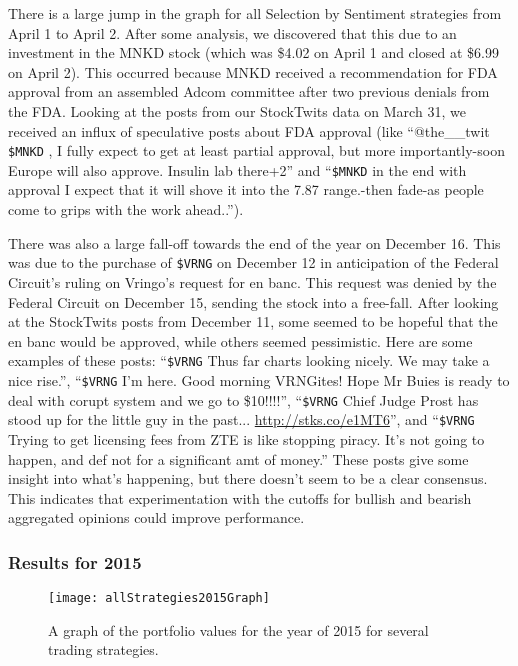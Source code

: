 There is a large jump in the graph for all Selection by Sentiment strategies from April 1 to April 2.
After some analysis, we discovered that this due to an investment in the MNKD stock (which was \$4.02 on April 1 and closed at \$6.99 on April 2).
This occurred because MNKD received a recommendation for FDA approval from an assembled Adcom committee after two previous denials from the FDA.
Looking at the posts from our StockTwits data on March 31, we received an influx of speculative posts about FDA approval (like ``@the\_\_twit \texttt{\$MNKD} , I fully expect to get at least partial approval, but more importantly-soon Europe will also approve. Insulin lab there+2'' and ``\texttt{\$MNKD} in the end with approval I expect that it will shove it into the 7.87 range.-then fade-as people come to grips with the work ahead..'').

There was also a large fall-off towards the end of the year on December 16.
This was due to the purchase of \texttt{\$VRNG} on December 12 in anticipation of the Federal Circuit’s ruling on Vringo’s request for en banc.
This request was denied by the Federal Circuit on December 15, sending the stock into a free-fall.
After looking at the StockTwits posts from December 11, some seemed to be hopeful that the en banc would be approved, while others seemed pessimistic.
Here are some examples of these posts: ``\texttt{\$VRNG} Thus far charts looking nicely. We may take a nice rise.'', ``\texttt{\$VRNG} I’m here. Good morning VRNGites! Hope Mr Buies is ready to deal with corupt system and we go to \$10!!!!'', ``\texttt{\$VRNG} Chief Judge Prost has stood up for the little guy in the past...  \url{http://stks.co/e1MT6}'', and ``\texttt{\$VRNG} Trying to get licensing fees from ZTE is like stopping piracy. It’s not going to happen, and def not for a significant amt of money.''
These posts give some insight into what’s happening, but there doesn’t seem to be a clear consensus.
This indicates that experimentation with the cutoffs for bullish and bearish aggregated opinions could improve performance.

\subsubsection{Results for 2015}

\begin{figure}[h]
  \begin{center}
    \texttt{[image: allStrategies2015Graph]}
  \end{center}
  \caption{A graph of the portfolio values for the year of 2015 for several trading strategies.}\label{fig:allStrategies2015Graph}
\end{figure}

